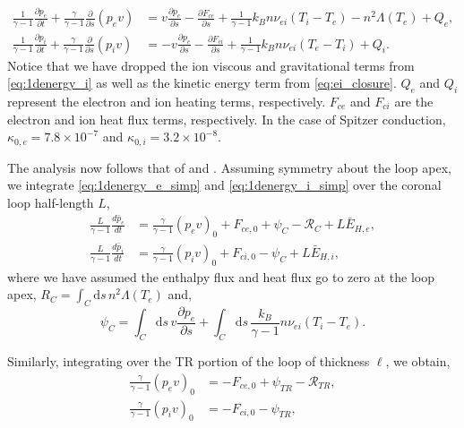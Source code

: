 \documentclass[apj]{emulateapj}
\begin{document}
	\begin{align}
		\frac{1}{\gamma - 1}\frac{\partial p_e}{\partial t} + \frac{\gamma}{\gamma - 1}\frac{\partial}{\partial s}(p_ev) &= v\frac{\partial p_e}{\partial s} - \frac{\partial F_{ce}}{\partial s} + \frac{1}{\gamma - 1}k_Bn\nu_{ei}(T_i-T_e) -n^2\Lambda(T_e)+Q_{e}, \label{eq:1denergy_e_simp} \\[0.5em]
		\frac{1}{\gamma - 1}\frac{\partial p_i}{\partial t} + \frac{\gamma}{\gamma - 1}\frac{\partial }{\partial s}(p_iv)&= -v\frac{\partial p_e}{\partial s} - \frac{\partial F_{ci}}{\partial s} + \frac{1}{\gamma - 1}k_Bn\nu_{ei}(T_e-T_i) + Q_{i}. \label{eq:1denergy_i_simp}
	\end{align}
	Notice that we have dropped the ion viscous and gravitational terms from  \autoref{eq:1denergy_i} as well as the kinetic energy term from \autoref{eq:ei_closure}. $Q_{e}$ and $Q_{i}$ represent the electron and ion heating terms, respectively. $F_{ce}$ and $F_{ci}$ are the electron and ion heat flux terms, respectively. In the case of Spitzer conduction, $\kappa_{0,e}=7.8\times10^{-7}$ and $\kappa_{0,i}=3.2\times10^{-8}$.
	\par The analysis now follows that of \citet{klimchuk_highly_2008} and \citet{cargill_enthalpy-based_2012}. Assuming symmetry about the loop apex, we integrate \autoref{eq:1denergy_e_simp} and \autoref{eq:1denergy_i_simp} over the coronal loop half-length $L$,
	\begin{align}
		\frac{L}{\gamma - 1}\frac{d \bar{p}_e}{dt} &= \frac{\gamma}{\gamma - 1}(p_ev)_0 + F_{ce,0} + \psi_C - \mathcal{R}_C + L\bar{E}_{H,e},\label{eq:1denergy_e_C} \\[0.5em]
		\frac{L}{\gamma - 1}\frac{d \bar{p}_i}{dt} &= \frac{\gamma}{\gamma - 1}(p_iv)_0 + F_{ci,0} - \psi_C + L\bar{E}_{H,i},\label{eq:1denergy_i_C}
	\end{align}
	where we have assumed the enthalpy flux and heat flux go to zero at the loop apex, $R_C=\int_C\mathrm{d}s\,n^2\Lambda(T_e)$ and,
	\begin{equation} 
		\psi_C=\int_C\mathrm{d}s\,v\frac{\partial p_e}{\partial s} + \int_C\mathrm{d}s\,\frac{k_B}{\gamma - 1}n\nu_{ei}(T_i - T_e).
	\end{equation}
	\par Similarly, integrating over the TR portion of the loop of thickness $\ell$, we obtain,
	\begin{align}
		\frac{\gamma}{\gamma - 1}(p_ev)_0 &= - F_{ce,0} + \psi_{TR} - \mathcal{R}_{TR}, \label{eq:1denergy_e_TR} \\[0.5em]
		\frac{\gamma}{\gamma - 1}(p_iv)_0 &=  - F_{ci,0} - \psi_{TR}, \label{eq:1denergy_i_TR}
	\end{align}
\end{document}
